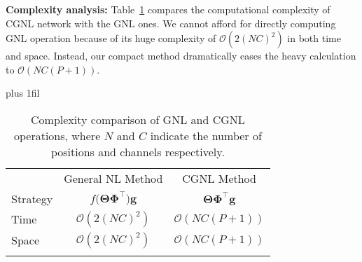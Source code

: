 \documentclass{article}
\begin{document}
\begin{table}[ht]
  \begin{minipage}[h]{0.54\textwidth}
    \textbf{Complexity analysis:}
    Table~\ref{table:computation complexity} compares the computational complexity of CGNL network with the GNL ones.
    We cannot afford for directly computing GNL operation because of its huge complexity of $\mathcal{O}(2(NC)^2)$ in both time and space.
    Instead, our compact method dramatically eases the heavy calculation to $\mathcal{O}(NC(P+1))$.
  \end{minipage} \hskip 5pt plus 1fil
  \begin{minipage}[h]{0.42\textwidth}
  \caption{\small{
    Complexity comparison of GNL and CGNL operations, where $N$ and $C$ indicate the number of positions and channels respectively.
  }}
  \centering
  \scriptsize
  \begin{tabular}[h]{lcc}
    \toprule
    & General NL Method  & CGNL Method \\
    \cmidrule(r){2-3}
    Strategy    & $f\big(\bm{\Theta} \bm{\Phi}^\top\big) \bm{g}$  & $\bm{\Theta} \bm{\Phi}^\top \bm{g}$ \\
    Time        & $\mathcal{O}(2(NC)^2)$                          & $\mathcal{O}(NC(P+1))$   \\
    Space       & $\mathcal{O}(2(NC)^2)$                          & $\mathcal{O}(NC(P+1))$   \\
    \bottomrule
  \label{table:computation complexity}
  \end{tabular}
  \end{minipage}
\end{table}
\end{document}
